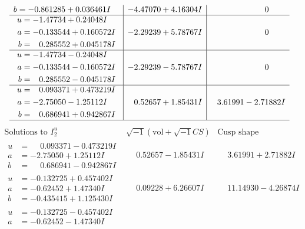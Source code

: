 \documentclass[1p]{elsarticle_modified}
\theoremstyle{definition}
\newcommand{\I}{\sqrt{-1}}
\begin{document}
$$\begin{array}{c|c|c}
\begin{aligned}
b &= -0.861285 + 0.036461 I\end{aligned}
 & -4.47070 + 4.16304 I & \phantom{-0.000000 } 0 \\ \hline\begin{aligned}
u &= -1.47734 + 0.24048 I \\
a &= -0.133544 + 0.160572 I \\
b &= \phantom{-}0.285552 + 0.045178 I\end{aligned}
 & -2.29239 + 5.78767 I & \phantom{-0.000000 } 0 \\ \hline\begin{aligned}
u &= -1.47734 - 0.24048 I \\
a &= -0.133544 - 0.160572 I \\
b &= \phantom{-}0.285552 - 0.045178 I\end{aligned}
 & -2.29239 - 5.78767 I & \phantom{-0.000000 } 0 \\ \hline\begin{aligned}
u &= \phantom{-}0.093371 + 0.473219 I \\
a &= -2.75050 - 1.25112 I \\
b &= \phantom{-}0.686941 + 0.942867 I\end{aligned}
 & \phantom{-}0.52657 + 1.85431 I & \phantom{-}3.61991 - 2.71882 I\\
 \hline 
 \end{array}$$\newpage$$\begin{array}{c|c|c}  
\text{Solutions to }I^u_{2}& \I (\text{vol} + \sqrt{-1}CS) & \text{Cusp shape}\\
 \hline 
\begin{aligned}
u &= \phantom{-}0.093371 - 0.473219 I \\
a &= -2.75050 + 1.25112 I \\
b &= \phantom{-}0.686941 - 0.942867 I\end{aligned}
 & \phantom{-}0.52657 - 1.85431 I & \phantom{-}3.61991 + 2.71882 I \\ \hline\begin{aligned}
u &= -0.132725 + 0.457402 I \\
a &= -0.62452 + 1.47340 I \\
b &= -0.435415 + 1.125430 I\end{aligned}
 & \phantom{-}0.09228 + 6.26607 I & \phantom{-}11.14930 - 4.26874 I \\ \hline\begin{aligned}
u &= -0.132725 - 0.457402 I \\
a &= -0.62452 - 1.47340 I \\

\end{aligned}
\end{array}$$
\end{document}
